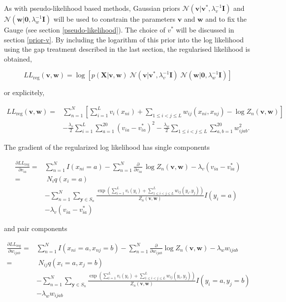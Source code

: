 \documentclass[12pt,a4paper,twoside]{book}
\newcommand{\eq}{\!=\!}
\newcommand{\Gauss}{\mathcal{N}}
\newcommand{\I}{\mathbf{I}}
\newcommand{\LLreg}{L\!L_\mathrm{reg}}
\newcommand{\Sn}{S_n}
\renewcommand{\v}{\mathbf{v}}
\newcommand{\via}{v_{ia}}
\newcommand{\w}{\mathbf{w}}
\newcommand{\wijab}{w_{ijab}}
\newcommand{\X}{\mathbf{X}}
\theoremstyle{definition}
\theoremstyle{definition}
\theoremstyle{remark}
\begin{document}
As with pseudo-likelihood based methods, Gaussian priors
\(\mathcal{N}( \v | \v^*, \lambda_v^{-1} \I)\) and
\(\mathcal{N}( \w |\boldsymbol 0, \lambda_w^{-1} \I)\) will be used to
constrain the parameters \(\v\) and \(\w\) and to fix the Gauge (see
section \ref{pseudo-likelihood}). The choice of \(v^*\) will be
discussed in section \ref{prior-v}. By including the logarithm of this
prior into the log likelihood using the gap treatment described in the
last section, the regularised likelihood is obtained,

\begin{equation}
    \LLreg(\v,\w)  = \log \left[ p(\X | \v,\w) \;  \Gauss (\v | \v^*, \lambda_v^{-1} \I)  \; \Gauss( \w | \boldsymbol 0, \lambda_w^{-1} \I) \right] 
\end{equation}

or explicitely,

\begin{align}
    \LLreg(\v,\w) =& \sum_{n=1}^N  \left[ \sum_{i=1}^L v_i(x_{ni}) + \sum_{1\le i<j\le L} w_{ij}(x_{ni},x_{nj}) - \log Z_n(\v,\w) \right] \\
                    & - \frac{\lambda_v}{2} \!\! \sum_{i=1}^L \sum_{a=1}^{20} (\via - \via^*)^2  - \frac{\lambda_w}{2}  \sum_{1 \le i < j \le L} \sum_{a,b=1}^{20} \wijab^2 .
\end{align}

The gradient of the regularized log likelihood has single components

\begin{align}
    \frac{\partial \LLreg}{\partial \via} =& \sum_{n=1}^N I(x_{ni}=a) - \sum_{n=1}^N \frac{\partial}{\partial \via} \, \log Z_n(\v,\w) - \lambda_v (\via - \via^*)\\
                                          =& \; N_i q(x_i \eq a) \\
                                          & - \sum_{n=1}^N \sum_{\mathbf{y} \in \Sn} \frac{  \exp \left( \sum_{i=1}^L v_i(y_i) + \sum_{1 \le i<j \le L}^L w_{ij}(y_i,y_j) \right) }{Z_n(\v,\w)}  I(y_i=a) \\
                                          & - \lambda_v (\via - \via^*) 
\label{eq:gradient-LLreg-single}
\end{align}

and pair components

\begin{align}
    \frac{\partial \LLreg}{\partial \wijab} =& \sum_{n=1}^N I(x_{ni} \eq a, x_{nj} \eq b) - \sum_{n=1}^N \frac{\partial}{\partial \wijab} \log Z_n(\v,\w)  - \lambda_w \wijab \\
                                            =& \; N_{ij} q(x_i \eq a, x_j=b) \\
                                            & - \sum_{n=1}^N \sum_{\mathbf{y} \in \Sn} \frac{ \exp \left( \sum_{i=1}^L v_i(y_i) + \sum_{1 \le i<j \le L}^L w_{ij}(y_i,y_j) \right) }{Z_n(\v,\w)} I(y_i \eq a, y_j \eq b) \\
                                            & - \lambda_w \wijab  
\label{eq:gradient-LLreg-pair}
\end{align}
\end{document}
